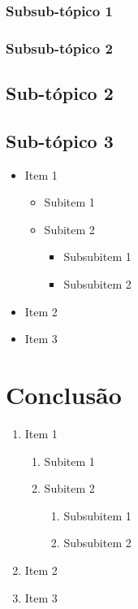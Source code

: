 \documentclass{article}
\begin{document}
\subsubsection{Subsub-tópico 1}
\lipsum[1]

\subsubsection{Subsub-tópico 2}
\lipsum[1]

\subsection{Sub-tópico 2}
\lipsum[2]

\subsection{Sub-tópico 3}
\lipsum[3]

\begin{itemize}
    \item Item 1
    \begin{itemize}
        \item Subitem 1
        \item Subitem 2
        \begin{itemize}
            \item Subsubitem 1
            \item Subsubitem 2
        \end{itemize}
    \end{itemize}
    \item Item 2
    \item Item 3
\end{itemize}

\section{Conclusão}
\lipsum[3]

\begin{enumerate}
    \item Item 1
    \begin{enumerate}
        \item Subitem 1
        \item Subitem 2
        \begin{enumerate}
            \item Subsubitem 1
            \item Subsubitem 2
        \end{enumerate}
    \end{enumerate}
    \item Item 2
    \item Item 3
\end{enumerate}

\end{document}
